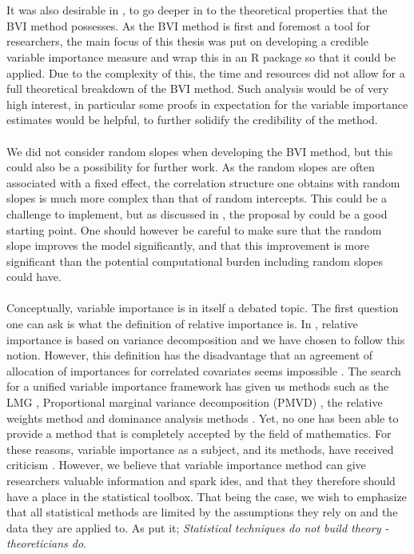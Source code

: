 \\
\\
It was also desirable in \citet{Arnstad}, to go deeper in to the theoretical properties that the BVI method possesses. As the BVI method is first and foremost a tool for researchers, the main focus of this thesis was put on developing a credible variable importance measure and wrap this in an R package so that it could be applied. Due to the complexity of this, the time and resources did not allow for a full theoretical breakdown of the BVI method. Such analysis would be of very high interest, in particular some proofs in expectation for the variable importance estimates would be helpful, to further solidify the credibility of the method. 
\\
\\
We did not consider random slopes when developing the BVI method, but this could also be a possibility for further work. As the random slopes are often associated with a fixed effect, the correlation structure one obtains with random slopes is much more complex than that of random intercepts. This could be a challenge to implement, but as discussed in , the proposal by \citet{Johnson2014} could be a good starting point. One should however be careful to make sure that the random slope improves the model significantly, and that this improvement is more significant than the potential computational burden including random slopes could have.
\\
\\
Conceptually, variable importance is in itself a debated topic. The first question one can ask is what the definition of relative importance is. In \citet{gromping_relaimpo}, relative importance is based on variance decomposition and we have chosen to follow this notion. However, this definition has the disadvantage that an agreement of allocation of importances for correlated covariates seems impossible \citep{Gromping_2015}. The search for a unified variable importance framework has given us methods such as the LMG \citep{gromping_relaimpo}, Proportional marginal variance decomposition (PMVD) \citep{gromping_relaimpo}, the relative weights method \citep{johnson_relative_weights} and dominance analysis methods \citep{budescu1993dominance}. Yet, no one has been able to provide a method that is completely accepted by the field of mathematics. For these reasons, variable importance as a subject, and its methods, have received criticism \citep{gromping_relaimpo}. However, we believe that variable importance method can give researchers valuable information and spark ides, and that they therefore should have a place in the statistical toolbox. That being the case, we wish to emphasize that all statistical methods are limited by the assumptions they rely on and the data they are applied to. As \citet{Sutherland_91} put it; \textit{Statistical techniques do not build theory - theoreticians do}.


